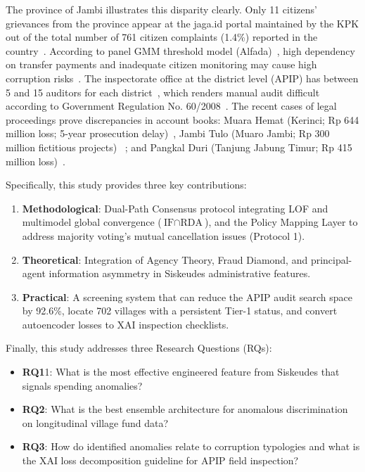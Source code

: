 \documentclass[conference]{IEEEtran}
\begin{document}
The province of Jambi illustrates this disparity clearly. Only 11 citizens’ grievances from the province appear at the jaga.id portal maintained by the KPK out of the total number of 761 citizen complaints (1.4\%) reported in the country~\cite{ref26}. According to panel GMM threshold model (Alfada)~\cite{ref27}, high dependency on transfer payments and inadequate citizen monitoring may cause high corruption risks~\cite{ref27}. The inspectorate office at the district level (APIP) has between 5 and 15 auditors for each district~\cite{ref12}, which renders manual audit difficult according to Government Regulation No. 60/2008~\cite{ref33}. The recent cases of legal proceedings prove discrepancies in account books: Muara Hemat (Kerinci; Rp 644 million loss; 5-year prosecution delay)~\cite{ref28,ref30}, Jambi Tulo (Muaro Jambi; Rp 300 million fictitious projects) ~\cite{ref29}; and Pangkal Duri (Tanjung Jabung Timur; Rp 415 million loss)~\cite{ref31}.

Specifically, this study provides three key contributions:
\begin{enumerate}
    \item \textbf{Methodological}: Dual-Path Consensus protocol integrating LOF and multimodel global convergence ($\text{IF} \cap \text{RDA}$), and the Policy Mapping Layer to address majority voting's mutual cancellation issues (Protocol 1).
    \item \textbf{Theoretical}: Integration of Agency Theory, Fraud Diamond, and principal-agent information asymmetry in Siskeudes administrative features.
    \item \textbf{Practical}: A screening system that can reduce the APIP audit search space by 92.6\%, locate 702 villages with a persistent Tier-1 status, and convert autoencoder losses to XAI inspection checklists.
\end{enumerate}

Finally, this study addresses three Research Questions (RQs):
\begin{itemize}
    \item \textbf{RQ1}1: What is the most effective engineered feature from Siskeudes that signals spending anomalies?
    \item \textbf{RQ2}: What is the best ensemble architecture for anomalous discrimination on longitudinal village fund data?
    \item \textbf{RQ3}: How do identified anomalies relate to corruption typologies and what is the XAI loss decomposition guideline for APIP field inspection?
\end{itemize}
\end{document}
